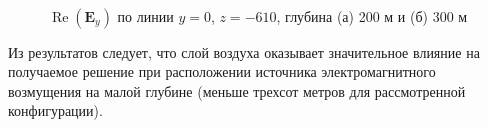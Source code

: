 \documentclass[a4paper,12pt]{article}
\renewcommand{\Re}{\mathop{\mathrm{Re}}\nolimits}
\begin{document}
\begin{figure}[H]
	\centering
	~
	\caption{$\Re(\mathbf{E}_y)$ по линии $y=0$, $z=-610$, глубина (а) 200 м и (б) 300 м}
	\label{fig:res1:200_300}
\end{figure}

Из результатов следует, что слой воздуха оказывает значительное влияние на получаемое решение при расположении источника электромагнитного возмущения на малой глубине (меньше трехсот метров для рассмотренной конфигурации).

\end{document}
